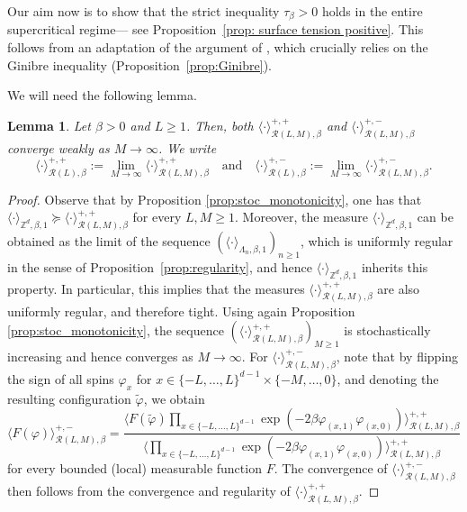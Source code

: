 \documentclass[11pt,a4paper]{article}
\newtheorem{lemma}[theorem]{Lemma}
\theoremstyle{definition}
\numberwithin{equation}{section}
\newcommand\cR{\mathcal{R}}
\begin{document}
Our aim now is to show that the strict inequality $\tau_{\beta}>0$ holds in the entire supercritical regime--- see Proposition~\ref{prop: surface tension positive}. This follows from an adaptation of the argument of \cite{lebowitz1981surface}, which crucially relies on the Ginibre inequality (Proposition~\ref{prop:Ginibre}). 

We will need the following lemma.

\begin{lemma}\label{lem:++}
Let $\beta> 0$ and $L\geq 1$. Then, both $\langle \cdot \rangle^{+,+}_{\cR(L,M),\beta}$ and $\langle \cdot \rangle^{+,-}_{\cR(L,M),\beta}$ converge weakly as $M\to\infty$. We write 
\begin{equation}
\langle \cdot \rangle^{+,+}_{\cR(L),\beta}:=\lim_{M\to\infty}\langle \cdot \rangle^{+,+}_{\cR(L,M),\beta}  \quad \text{and} \quad \langle \cdot \rangle^{+,-}_{\cR(L),\beta}:=\lim_{M\to\infty}\langle \cdot \rangle^{+,-}_{\cR(L,M),\beta}. 
\end{equation}
\end{lemma}

\begin{proof} Observe that by Proposition \ref{prop:stoc_monotonicity}, one has that $\langle \cdot\rangle_{\mathbb Z^d,\beta,1}\succcurlyeq \langle \cdot \rangle^{+,+}_{\cR(L,M),\beta}$ for every $L,M\geq 1$. Moreover, the measure $\langle \cdot\rangle_{\mathbb Z^d,\beta,1}$ can be obtained as the limit of the sequence $(\langle \cdot\rangle_{\Lambda_n,\beta,1})_{n\geq 1}$, which is uniformly regular in the sense of Proposition~\ref{prop:regularity}, and hence $\langle \cdot\rangle_{\mathbb Z^d,\beta,1}$ inherits this property.  In particular, this implies that the measures $ \langle \cdot \rangle^{+,+}_{\cR(L,M),\beta}$ are also uniformly regular, and therefore tight. Using again Proposition \ref{prop:stoc_monotonicity}, the sequence $( \langle \cdot \rangle^{+,+}_{\cR(L,M),\beta})_{M\geq 1}$ is stochastically increasing and hence converges as $M\rightarrow \infty$.
For $\langle \cdot \rangle^{+,-}_{\cR(L,M),\beta}$, note that by flipping the sign of all spins $\varphi_x$ for $x\in \{-L,\ldots,L\}^{d-1}\times \{-M,\ldots,0\}$, and denoting the resulting configuration $\tilde \varphi$,  we obtain
\begin{equation}
\langle F(\varphi) \rangle^{+,-}_{\cR(L,M),\beta}=  \frac{\langle F(\tilde \varphi) \prod_{x\in \{-L,\ldots,L\}^{d-1}}\exp(-2\beta \varphi_{(x,1)} \varphi_{(x,0)} )\rangle^{+,+}_{\cR(L,M),\beta}}{\langle \prod_{x\in \{-L,\ldots,L\}^{d-1}}\exp(-2\beta \varphi_{(x,1)} \varphi_{(x,0)} )\rangle^{+,+}_{\cR(L,M),\beta}}  
\end{equation}
for every bounded (local) measurable function $F$. The convergence of $\langle \cdot \rangle^{+,-}_{\cR(L,M),\beta}$ then follows from the convergence and regularity of $\langle \cdot \rangle^{+,+}_{\cR(L,M),\beta}$.
\end{proof}
\end{document}
